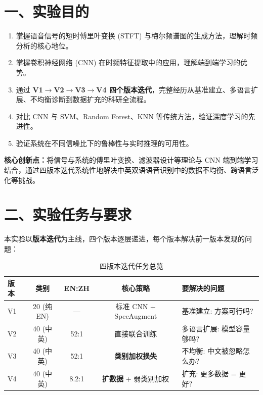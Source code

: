 ﻿\documentclass[12pt,a4paper]{article}
\begin{document}
\section*{一、实验目的}

\begin{enumerate}[leftmargin=*]
\item 掌握语音信号的短时傅里叶变换 (STFT) 与梅尔频谱图的生成方法，理解时频分析的核心地位。
\item 掌握卷积神经网络 (CNN) 在时频特征提取中的应用，理解端到端学习的优势。
\item 通过 \textbf{V1$\to$V2$\to$V3$\to$V4 四个版本迭代}，完整经历从基准建立、多语言扩展、不均衡诊断到数据扩充的科研全流程。
\item 对比 CNN 与 SVM、Random Forest、KNN 等传统方法，验证深度学习的先进性。
\item 验证系统在不同信噪比下的鲁棒性与实时推理的可用性。
\end{enumerate}

\textbf{核心创新点：}将信号与系统的傅里叶变换、滤波器设计等理论与 CNN 端到端学习结合，通过四版本迭代系统性地解决中英双语语音识别中的数据不均衡、跨语言泛化等挑战。

\section*{二、实验任务与要求}

本实验以\textbf{版本迭代}为主线，四个版本逐层递进，每个版本解决前一版本发现的问题：

\begin{table}[H]\centering\caption{四版本迭代任务总览}\label{tab:tasks}
\begin{tabular}{l|c|c|c|l}
\toprule
\textbf{版本} & \textbf{类别} & \textbf{EN:ZH} & \textbf{核心策略} & \textbf{要解决的问题} \\
\midrule
V1 & 20 (纯EN) & — & 标准 CNN + SpecAugment & 基准建立: 方案可行吗? \\
V2 & 40 (中英) & 52:1 & 直接联合训练 & 多语言扩展: 模型容量够吗? \\
V3 & 40 (中英) & 52:1 & \textbf{类别加权损失} & 不均衡: 中文被忽略怎么办? \\
V4 & 40 (中英) & 8.2:1 & \textbf{扩数据} + 弱类别加权 & 扩充: 更多数据 = 更好? \\
\bottomrule
\end{tabular}
\end{table}
\end{document}
